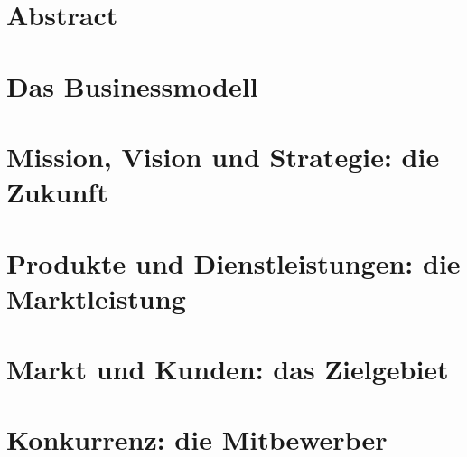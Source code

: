 

\newcommand{\SUBJECT}{Businessplan}
\newcommand{\TITLE}{Digital Fitness Coach}







\section{Abstract}
\cite{ackema:1998}




\section{Das Businessmodell}

\section{Mission, Vision und Strategie: die Zukunft}

\section{Produkte und Dienstleistungen: die Marktleistung}

\section{Markt und Kunden: das Zielgebiet}

\section{Konkurrenz: die Mitbewerber}

